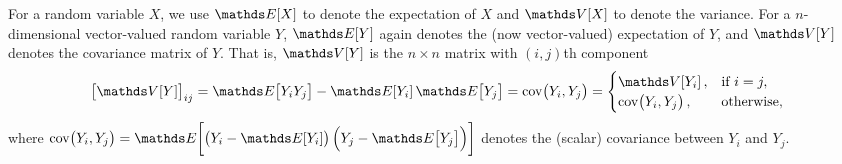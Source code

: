 For a random variable \(X\), we use \(\avg{X}\) to denote the expectation of \(X\) and \(\var{X}\) to denote the variance.
For a \(n\)-dimensional vector-valued random variable \(Y\), \(\avg{Y}\) again denotes the (now vector-valued) expectation of \(Y\), and \(\var{Y}\) denotes the covariance matrix of \(Y\).
That is, \(\var{Y}\) is the \(n\times n\) matrix with \((i,j)\)th component
\[
	\left[\var{Y}\right]_{ij} = \avg{Y_iY_j} - \avg{Y_i}\avg{Y_j} = \cov{Y_i, Y_j} = \begin{cases}
		\var{Y_i},      & \text{if } i = j, \\
		\cov{Y_i, Y_j}, & \text{otherwise},
	\end{cases}
\]
where \(\cov{Y_i, Y_j} = \avg{\left(Y_i - \avg{Y_i}\right)\left(Y_j - \avg{Y_j}\right)}\) denotes the (scalar) covariance between \(Y_i\) and \(Y_j\).

